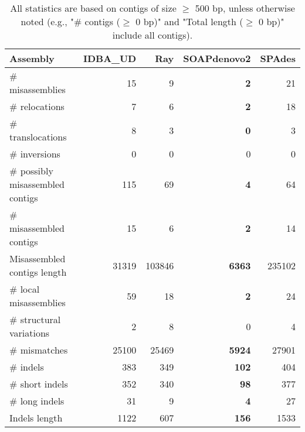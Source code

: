 \documentclass[12pt,a4paper]{article}
\begin{document}
\begin{table}[ht]
\begin{center}
\caption{All statistics are based on contigs of size $\geq$ 500 bp, unless otherwise noted (e.g., "\# contigs ($\geq$ 0 bp)" and "Total length ($\geq$ 0 bp)" include all contigs).}
\begin{tabular}{|l*{4}{|r}|}
\hline
Assembly & IDBA\_UD & Ray & SOAPdenovo2 & SPAdes \\ \hline
\# misassemblies & 15 & 9 & {\bf 2} & 21 \\ \hline
\hspace{5mm}\# relocations & 7 & 6 & {\bf 2} & 18 \\ \hline
\hspace{5mm}\# translocations & 8 & 3 & {\bf 0} & 3 \\ \hline
\hspace{5mm}\# inversions & 0 & 0 & 0 & 0 \\ \hline
\# possibly misassembled contigs & 115 & 69 & {\bf 4} & 64 \\ \hline
\# misassembled contigs & 15 & 6 & {\bf 2} & 14 \\ \hline
Misassembled contigs length & 31319 & 103846 & {\bf 6363} & 235102 \\ \hline
\# local misassemblies & 59 & 18 & {\bf 2} & 24 \\ \hline
\# structural variations & 2 & 8 & 0 & 4 \\ \hline
\# mismatches & 25100 & 25469 & {\bf 5924} & 27901 \\ \hline
\# indels & 383 & 349 & {\bf 102} & 404 \\ \hline
\hspace{5mm}\# short indels & 352 & 340 & {\bf 98} & 377 \\ \hline
\hspace{5mm}\# long indels & 31 & 9 & {\bf 4} & 27 \\ \hline
Indels length & 1122 & 607 & {\bf 156} & 1533 \\ \hline
\end{tabular}
\end{center}
\end{table}
\end{document}
